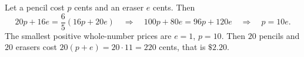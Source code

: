 Let a pencil cost $p$ cents and an eraser $e$ cents. Then
\[
20p+16e=\dfrac{6}{5}(16p+20e)\quad\Longrightarrow\quad100p+80e=96p+120e\quad\Longrightarrow\quad p=10e .
\]
The smallest positive whole-number prices are $e=1$, $p=10$. Then $20$ pencils and $20$ erasers cost $20(p+e)=20\cdot11=220$ cents, that is $\boxed{\$2.20}$.
